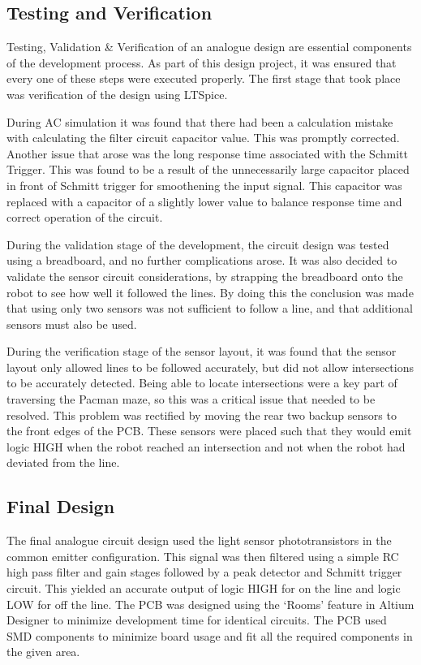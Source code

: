 \documentclass{article}
\begin{document}
\subsection{Testing and Verification}

Testing, Validation \& Verification of an analogue design are essential components of the development process. As part of this design project, it was ensured that every one of these steps were executed properly. The first stage that took place was verification of the design using LTSpice.

During AC simulation it was found that there had been a calculation mistake with calculating the filter circuit capacitor value. This was promptly corrected. Another issue that arose was the long response time associated with the Schmitt Trigger. This was found to be a result of the unnecessarily large capacitor placed in front of Schmitt trigger for smoothening the input signal. This capacitor was replaced with a capacitor of a slightly lower value to balance response time and correct operation of the circuit.

During the validation stage of the development, the circuit design was tested using a breadboard, and no further complications arose. It was also decided to validate the sensor circuit considerations, by strapping the breadboard onto the robot to see how well it followed the lines. By doing this the conclusion was made that using only two sensors was not sufficient to follow a line, and that additional sensors must also be used. 

During the verification stage of the sensor layout, it was found that the sensor layout only allowed lines to be followed accurately, but did not allow intersections to be accurately detected. Being able to locate intersections were a key part of traversing the Pacman maze, so this was a critical issue that needed to be resolved. This problem was rectified by moving the rear two backup sensors to the front edges of the PCB. These sensors were placed such that they would emit logic HIGH when the robot reached an intersection and not when the robot had deviated from the line.

\subsection{Final Design}

The final analogue circuit design used the light sensor phototransistors in the common emitter configuration. This signal was then filtered using a simple RC high pass filter and gain stages followed by a peak detector and Schmitt trigger circuit. This yielded an accurate output of logic HIGH for on the line and logic LOW for off the line. The PCB was designed using the `Rooms' feature in Altium Designer to minimize development time for identical circuits. The PCB used SMD components to minimize board usage and fit all the required components in the given area.
\end{document}
